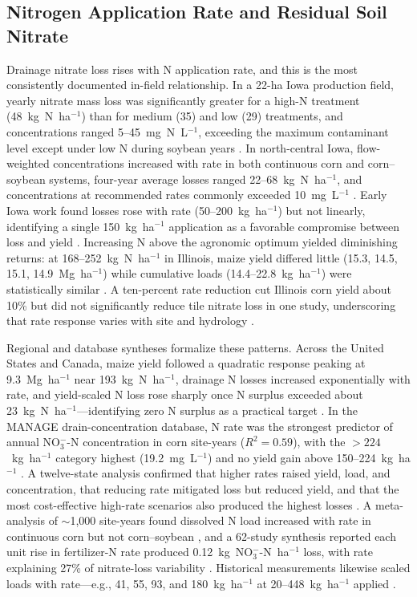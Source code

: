 \subsection{Nitrogen Application Rate and Residual Soil Nitrate}

Drainage nitrate loss rises with N application rate, and this is the most consistently documented in-field relationship. In a 22-ha Iowa production field, yearly nitrate mass loss was significantly greater for a high-N treatment (48~kg~N~ha$^{-1}$) than for medium (35) and low (29) treatments, and concentrations ranged 5--45~mg~N~L$^{-1}$, exceeding the maximum contaminant level except under low N during soybean years \parencite{Jaynes2001}. In north-central Iowa, flow-weighted concentrations increased with rate in both continuous corn and corn--soybean systems, four-year average losses ranged 22--68~kg~N~ha$^{-1}$, and concentrations at recommended rates commonly exceeded 10~mg~L$^{-1}$ \parencite{Helmers2012b}. Early Iowa work found losses rose with rate (50--200~kg~ha$^{-1}$) but not linearly, identifying a single 150~kg~ha$^{-1}$ application as a favorable compromise between loss and yield \parencite{Azevedo1997}. Increasing N above the agronomic optimum yielded diminishing returns: at 168--252~kg~N~ha$^{-1}$ in Illinois, maize yield differed little (15.3, 14.5, 15.1, 14.9~Mg~ha$^{-1}$) while cumulative loads (14.4--22.8~kg~ha$^{-1}$) were statistically similar \parencite{Li2023b}. A ten-percent rate reduction cut Illinois corn yield about 10\% but did not significantly reduce tile nitrate loss in one study, underscoring that rate response varies with site and hydrology \parencite{Gentry2024}.

Regional and database syntheses formalize these patterns. Across the United States and Canada, maize yield followed a quadratic response peaking at 9.3~Mg~ha$^{-1}$ near 193~kg~N~ha$^{-1}$, drainage N losses increased exponentially with rate, and yield-scaled N loss rose sharply once N surplus exceeded about 23~kg~N~ha$^{-1}$---identifying zero N surplus as a practical target \parencite{Zhao2016}. In the MANAGE drain-concentration database, N rate was the strongest predictor of annual NO$_3^-$-N concentration in corn site-years ($R^2=0.59$), with the $>224$~kg~ha$^{-1}$ category highest (19.2~mg~L$^{-1}$) and no yield gain above 150--224~kg~ha$^{-1}$ \parencite{Hertzberger2019}. A twelve-state analysis confirmed that higher rates raised yield, load, and concentration, that reducing rate mitigated loss but reduced yield, and that the most cost-effective high-rate scenarios also produced the highest losses \parencite{Liu2021}. A meta-analysis of $\sim$1{,}000 site-years found dissolved N load increased with rate in continuous corn but not corn--soybean \parencite{Christianson2015b}, and a 62-study synthesis reported each unit rise in fertilizer-N rate produced 0.12~kg~NO$_3^-$-N~ha$^{-1}$ loss, with rate explaining 27\% of nitrate-loss variability \parencite{Chatterjee2020b}. Historical measurements likewise scaled loads with rate---e.g., 41, 55, 93, and 180~kg~ha$^{-1}$ at 20--448~kg~ha$^{-1}$ applied \parencite{Ritter2015}.

